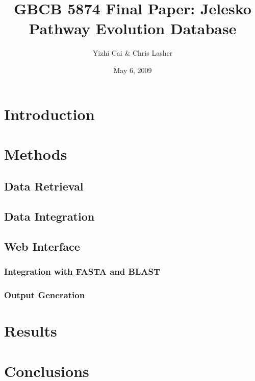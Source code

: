 \documentclass[twoside,letterpaper,11pt]{article}
\author{Yizhi Cai \& Chris Lasher}
\title{GBCB 5874 Final Paper: Jelesko Pathway Evolution Database}
\date{May 6, 2009}
\begin{document}
\maketitle

\section{Introduction}

\section{Methods}


\subsection{Data Retrieval}


\subsection{Data Integration}


\subsection{Web Interface}




\subsubsection{Integration with FASTA and BLAST}





\subsubsection{Output Generation}


\section{Results}



\section{Conclusions}
\end{document}
